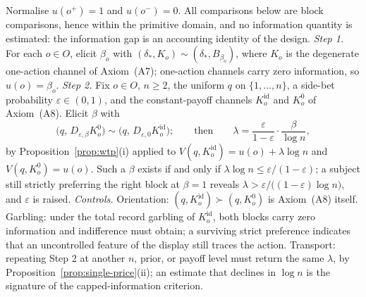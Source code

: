 \begin{remark}\label{rem:elicitation}
Normalise $u(o^+)=1$ and $u(o^-)=0$.  All comparisons below are block comparisons, hence within the primitive
domain, and no information quantity is estimated: the information gap is an accounting identity of the design.
\emph{Step 1.}  For each $o\in O$, elicit $\beta_o$ with $(\delta_\ast,K_o)\sim(\delta_\ast,B_{\beta_o})$, where
$K_o$ is the degenerate one-action channel of Axiom~\textup{(A7)}; one-action channels carry zero information, so
$u(o)=\beta_o$.
\emph{Step 2.}  Fix $o\in O$, $n\ge2$, the uniform $q$ on $\{1,\dots,n\}$, a side-bet probability $\varepsilon\in(0,1)$, and
the constant-payoff channels $K^{\mathrm{id}}_o$ and $K^0_o$ of Axiom~\textup{(A8)}.  Elicit $\beta$ with
\[
 \bigl(q,\,D_{\varepsilon,\beta}K^{0}_o\bigr)\sim\bigl(q,\,D_{\varepsilon,0}K^{\mathrm{id}}_o\bigr);
 \qquad\text{then}\qquad
 \lambda=\frac{\varepsilon}{1-\varepsilon}\cdot\frac{\beta}{\log n},
\]
by Proposition~\ref{prop:wtp}\textup{(i)} applied to $V(q,K^{\mathrm{id}}_o)=u(o)+\lambda\log n$ and
$V(q,K^{0}_o)=u(o)$.  Such a $\beta$ exists if and only if $\lambda\log n\le\varepsilon/(1-\varepsilon)$; a
subject still strictly preferring the right block at $\beta=1$ reveals
$\lambda>\varepsilon/\bigl((1-\varepsilon)\log n\bigr)$, and $\varepsilon$ is raised.
\emph{Controls.}  Orientation: $(q,K^{\mathrm{id}}_o)\succ(q,K^{0}_o)$ is Axiom~\textup{(A8)} itself.  Garbling:
under the total record garbling of $K^{\mathrm{id}}_o$, both blocks carry zero information and indifference must
obtain; a surviving strict preference indicates that an uncontrolled feature of the display still traces the
action.  Transport: repeating Step 2 at another $n$, prior, or payoff level must return the same $\lambda$, by
Proposition~\ref{prop:single-price}\textup{(ii)}; an estimate that declines in $\log n$ is the signature of the
capped-information criterion.
\end{remark}
